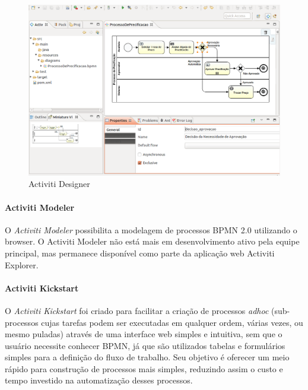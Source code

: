 \begin{figure}[H]
\centering
\includegraphics[width=1\textwidth]{imagens/activiti_designer.png}
\caption{Activiti Designer}
\label{fig:activiti_designer}
\end{figure}

\paragraph{Activiti Modeler}\label{sec:automatizacao_processos-gestao_processos_activiti_modeler}

O \textit{Activiti Modeler} possibilita a modelagem de processos BPMN 2.0 utilizando o browser. O Activiti Modeler não está mais em desenvolvimento ativo pela equipe principal, mas permanece disponível como parte da aplicação web Activiti Explorer.

\paragraph{Activiti Kickstart}\label{sec:automatizacao_processos-gestao_processos_activiti_kickstart}

O \textit{Activiti Kickstart} foi criado para facilitar a criação de processos \textit{adhoc} (sub-processos cujas tarefas podem ser executadas em qualquer ordem, várias vezes, ou mesmo puladas) através de uma interface web simples e intuitiva, sem que o usuário necessite conhecer BPMN, já que são utilizados tabelas e formulários simples para a definição do fluxo de trabalho. Seu objetivo é oferecer um meio rápido para construção de processos mais simples, reduzindo assim o custo e tempo investido na automatização desses processos.


